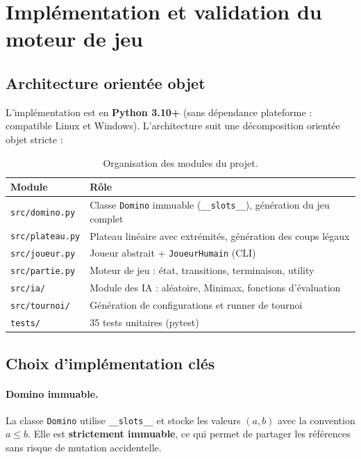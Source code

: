 \documentclass[11pt,a4paper]{article}
\begin{document}
\section{Implémentation et validation du moteur de jeu}

\subsection{Architecture orientée objet}

L'implémentation est en \textbf{Python 3.10+} (sans dépendance plateforme : compatible
Linux et Windows). L'architecture suit une décomposition orientée objet stricte :

\begin{table}[H]
\centering
\begin{tabular}{ll}
\toprule
\textbf{Module} & \textbf{Rôle} \\
\midrule
\texttt{src/domino.py} & Classe \texttt{Domino} immuable (\texttt{\_\_slots\_\_}), génération du jeu complet \\
\texttt{src/plateau.py} & Plateau linéaire avec extrémités, génération des coups légaux \\
\texttt{src/joueur.py} & Joueur abstrait + \texttt{JoueurHumain} (CLI) \\
\texttt{src/partie.py} & Moteur de jeu : état, transitions, terminaison, utility \\
\texttt{src/ia/} & Module des IA : aléatoire, Minimax, fonctions d'évaluation \\
\texttt{src/tournoi/} & Génération de configurations et runner de tournoi \\
\texttt{tests/} & 35 tests unitaires (pytest) \\
\bottomrule
\end{tabular}
\caption{Organisation des modules du projet.}
\end{table}

\subsection{Choix d'implémentation clés}

\paragraph{Domino immuable.} La classe \texttt{Domino} utilise \texttt{\_\_slots\_\_}
et stocke les valeurs $(a, b)$ avec la convention $a \leq b$. Elle est \textbf{strictement
immuable}, ce qui permet de partager les références sans risque de mutation accidentelle.
\end{document}
